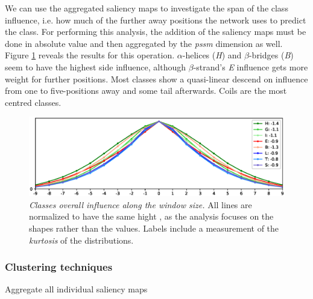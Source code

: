 We can use the aggregated saliency maps to investigate the span of the class influence, i.e. how much of the further away positions the network uses to predict the class. For performing this analysis, the addition of the saliency maps must be done in absolute value and then aggregated by the \textit{pssm} dimension as well. Figure \ref{fig:sheer_class_aa} reveals the results for this operation. $\alpha$-helices (\textit{H}) and $\beta$-bridges (\textit{B}) seem to have the highest side influence, although $\beta$-strand's \textit{E} influence gets more weight for further positions. Most classes show a quasi-linear descend on influence from one to five-positions away and some tail afterwards. Coils are the most centred classes.

\begin{figure}
	\centering
	\includegraphics[width=1\linewidth]{Figures/sheer_class_aa}
	\caption{\textit{Classes overall influence along the window size.} All lines are normalized to have the same hight , as the analysis focuses on the shapes rather than the values. Labels include a measurement of the \textit{kurtosis} of the distributions.}
	\label{fig:sheer_class_aa}
\end{figure}



\subsubsection*{Clustering techniques}
Aggregate all individual saliency maps %

